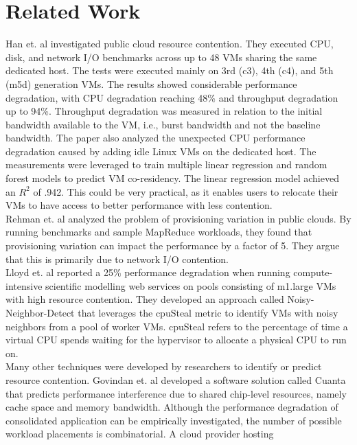 \chapter{Related Work}\label{chapter:related}

Han et. al \cite{characterizing_public} investigated public cloud resource contention. They executed
CPU, disk, and network I/O benchmarks across up to 48 VMs sharing the same dedicated host. The tests were
executed mainly on 3rd (c3), 4th (c4), and 5th (m5d) generation VMs.  
The results showed considerable performance degradation, with CPU degradation reaching 48\%
and throughput degradation up to 94\%. Throughput degradation was measured in relation to the initial 
bandwidth available to the VM, i.e., burst bandwidth and not the baseline bandwidth. 
The paper also analyzed the 
unexpected CPU performance degradation caused by adding idle Linux VMs on the dedicated host. 
The measurements were leveraged to train multiple linear regression and random forest models to predict
VM co-residency. The linear regression model achieved an $R^2$ of .942.
This could be very practical, as it enables users to relocate their VMs to have 
access to better performance with less contention. \\
Rehman et. al \cite{initial_findings} analyzed the problem of provisioning variation in public clouds. 
By running benchmarks and sample MapReduce workloads, they found that provisioning variation can 
impact the performance by a factor of 5. They argue that this is primarily due to network I/O contention. \\
Lloyd et. al \cite{mitigating_resource} reported a 25\% performance degradation when 
running compute-intensive scientific modelling web services on pools consisting of m1.large VMs with 
high resource contention. They developed an approach called Noisy-Neighbor-Detect that leverages 
the cpuSteal metric to identify VMs with noisy neighbors from a pool of worker VMs. 
cpuSteal refers to the percentage of time a virtual CPU spends waiting for the hypervisor to allocate 
a physical CPU to run on. \\
Many other techniques were developed by researchers to identify or predict resource contention.
Govindan et. al \cite{cache_contention} developed a software solution called Cuanta 
that predicts performance interference due to shared chip-level resources, namely cache space and memory 
bandwidth. Although the performance degradation of consolidated application can be empirically
investigated, the number of possible workload placements is combinatorial. A cloud provider hosting 
